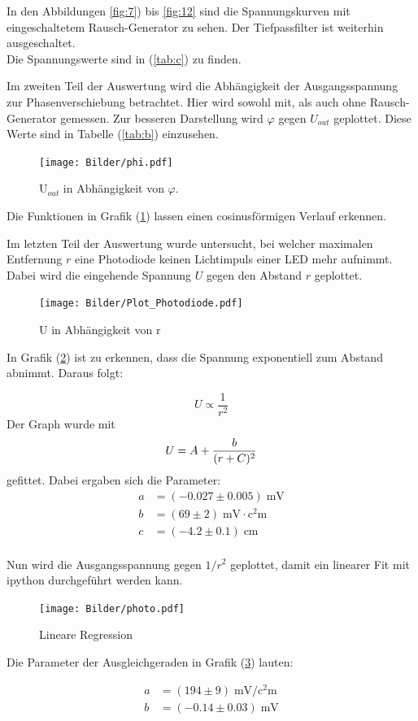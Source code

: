 In den Abbildungen \eqref{fig:7}) bis \eqref{fig:12} sind die Spannungskurven mit
eingeschaltetem Rausch-Generator zu sehen. Der Tiefpassfilter ist weiterhin ausgeschaltet. \\
Die Spannungswerte sind in (\ref{tab:c}) zu finden. \\

\newpage

Im zweiten Teil der Auswertung wird die Abhängigkeit der Ausgangsspannung zur Phasenverschiebung
betrachtet. Hier wird sowohl mit, als auch ohne Rausch-Generator gemessen. Zur besseren
Darstellung wird $\varphi$ gegen $U_{out}$ geplottet. Diese Werte sind in Tabelle (\ref{tab:b}) einzusehen.

\begin{figure}[H]
  \centering
  \texttt{[image: Bilder/phi.pdf]}
  \caption{U$_{out}$ in Abhängigkeit von $\varphi$.}
  \label{fig:Uout}
\end{figure}

Die Funktionen in Grafik (\ref{fig:Uout}) lassen einen cosinusförmigen Verlauf erkennen. \\

\newpage


Im letzten Teil der Auswertung wurde untersucht, bei welcher maximalen Entfernung $r$
eine Photodiode keinen Lichtimpuls einer LED mehr aufnimmt. Dabei wird die eingehende Spannung $U$
gegen den Abstand $r$ geplottet.
\begin{figure}[H]
  \centering
  \texttt{[image: Bilder/Plot\_Photodiode.pdf]}
  \caption{U in Abhängigkeit von r}
  \label{fig:led}
\end{figure}

In Grafik (\ref{fig:led}) ist zu erkennen, dass die Spannung exponentiell zum Abstand
abnimmt. Daraus folgt:

\begin{equation*}
  U \propto \frac{1}{r^2}
\end{equation*}
Der Graph wurde mit
\begin{equation}
U = A + \frac{b}{(r+C)^2} \notag
\end{equation}
gefittet.
Dabei ergaben sich die Parameter:
\begin{align*}
  a &= (-0.027 ± 0.005) \; \si{\milli\volt} \\
  b &= (69 ± 2)    \;   \si{\milli\volt \cdot\square\centi\meter}        \\
  c &= (-4.2 ± 0.1) \; \si{\centi\meter}
\end{align*}
\\
Nun wird die Ausgangsspannung gegen $1/r^2$ geplottet, damit ein linearer Fit mit ipython durchgeführt
werden kann.

\begin{figure}[!h]
\centering
\texttt{[image: Bilder/photo.pdf]}
\caption{Lineare Regression}
\label{fig:lin}
\end{figure}

Die Parameter der Ausgleichgeraden in Grafik (\ref{fig:lin}) lauten:

\begin{align*}
    a &= (194 ± 9) \; \si{\milli\volt\per\square\centi\meter} \\
    b &= (-0.14 ± 0.03) \; \si{\milli\volt}
\end{align*}
